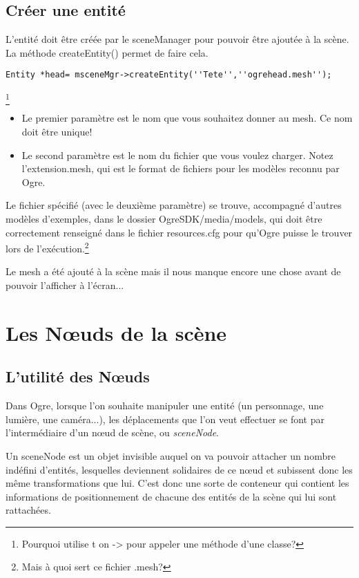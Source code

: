 \subsection{Créer une entité}

L'entité doit être créée par le sceneManager pour pouvoir être ajoutée à la scène. La méthode createEntity() permet de faire cela.
\begin{lstlisting}
Entity *head= msceneMgr->createEntity(''Tete'',''ogrehead.mesh'');
\end{lstlisting}\footnote{Pourquoi utilise t on -> pour appeler une méthode d'une classe?}

\begin{itemize}
\item Le premier paramètre est le nom que vous souhaitez donner au mesh. Ce nom doit être unique!
\item Le second paramètre est le nom du fichier que vous voulez charger. Notez l'extension.mesh, qui est le format de fichiers pour les modèles reconnu par Ogre.
\end{itemize}




Le fichier spécifié (avec le deuxième paramètre) se trouve, accompagné d'autres modèles d'exemples, dans le dossier OgreSDK/media/models, qui doit être correctement renseigné dans le fichier resources.cfg pour qu'Ogre puisse le trouver lors de l'exécution.\footnote{Mais à quoi sert ce fichier .mesh?}

Le mesh a été ajouté à la scène mais il nous manque encore une chose avant de pouvoir l'afficher à l'écran...



\section{Les Nœuds de la scène}



\subsection{L'utilité des Nœuds}

Dans Ogre, lorsque l'on souhaite manipuler une entité (un personnage, une lumière, une caméra...), les déplacements que l'on veut effectuer se font par l'intermédiaire d'un nœud de scène, ou \textit{sceneNode}.

Un sceneNode est un objet invisible auquel on va pouvoir attacher un nombre indéfini d'entités, lesquelles deviennent solidaires de ce nœud et subissent donc les même transformations que lui. C'est donc une sorte de conteneur qui contient les informations de positionnement de chacune des entités de la scène qui lui sont rattachées.

